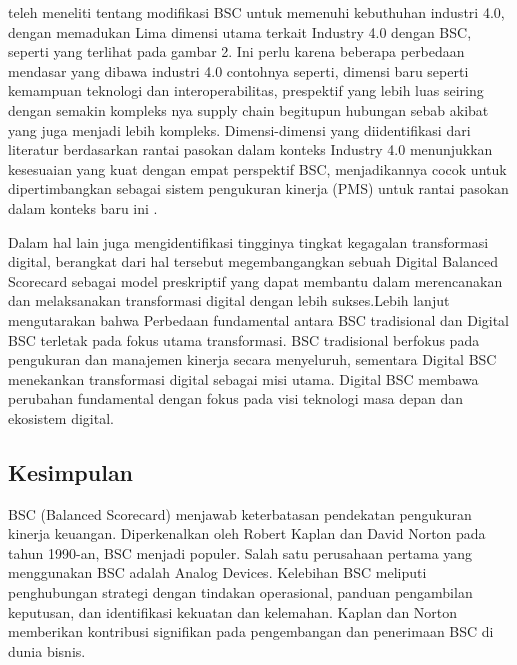 \documentclass{article}
\begin{document}
\cite{Frederico2020PerformanceMF} teleh meneliti tentang modifikasi BSC untuk memenuhi kebuthuhan industri 4.0, dengan memadukan Lima dimensi utama terkait Industry 4.0 dengan BSC, seperti yang terlihat pada gambar 2. Ini perlu karena  beberapa perbedaan mendasar yang dibawa industri 4.0 contohnya seperti, dimensi baru seperti kemampuan teknologi dan interoperabilitas, prespektif yang lebih luas seiring dengan semakin kompleks nya supply chain begitupun  hubungan sebab akibat yang juga menjadi lebih kompleks.  Dimensi-dimensi yang diidentifikasi dari literatur berdasarkan rantai pasokan dalam konteks Industry 4.0 menunjukkan kesesuaian yang kuat dengan empat perspektif BSC, menjadikannya cocok untuk dipertimbangkan sebagai sistem pengukuran kinerja (PMS) untuk rantai pasokan dalam konteks baru ini \cite{Frederico2020PerformanceMF}.

Dalam hal lain juga \cite{Fabac2022} mengidentifikasi tingginya tingkat kegagalan transformasi digital, berangkat dari hal tersebut \cite{Fabac2022} megembangangkan sebuah Digital Balanced Scorecard sebagai model preskriptif yang dapat membantu dalam merencanakan dan melaksanakan transformasi digital dengan lebih sukses.Lebih lanjut \cite{Fabac2022} mengutarakan bahwa Perbedaan fundamental antara BSC tradisional dan Digital BSC terletak pada fokus utama transformasi. BSC tradisional berfokus pada pengukuran dan manajemen kinerja secara menyeluruh, sementara Digital BSC menekankan transformasi digital sebagai misi utama. Digital BSC membawa perubahan fundamental dengan fokus pada visi teknologi masa depan dan ekosistem digital.



\subsection*{Kesimpulan}
BSC (Balanced Scorecard) menjawab keterbatasan pendekatan pengukuran kinerja keuangan. Diperkenalkan oleh Robert Kaplan dan David Norton pada tahun 1990-an, BSC menjadi populer. Salah satu perusahaan pertama yang menggunakan BSC adalah Analog Devices. Kelebihan BSC meliputi penghubungan strategi dengan tindakan operasional, panduan pengambilan keputusan, dan identifikasi kekuatan dan kelemahan. Kaplan dan Norton memberikan kontribusi signifikan pada pengembangan dan penerimaan BSC di dunia bisnis.
\end{document}
